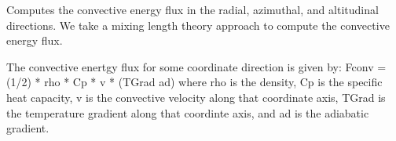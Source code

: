 \documentclass[letterpaper,10pt,english]{sphinxmanual}
\begin{document}
\begin{fulllineitems}
\begin{fulllineitems}
\label{\detokenize{CoolDwarf.star:CoolDwarf.star.sphere.VoxelSphere.convective_energy_flux}}
\pysigstartsignatures
{}
\pysigstopsignatures
\sphinxAtStartPar
Computes the convective energy flux in the radial, azimuthal, and altitudinal directions.
We take a mixing length theory approach to compute the convective energy flux.

\sphinxAtStartPar
The convective enertgy flux for some coordinate direction is given by:
Fconv = (1/2) * rho * Cp * v * (TGrad \sphinxhyphen{} ad)
where rho is the density, Cp is the specific heat capacity, v is the convective velocity along that coordinate axis,
TGrad is the temperature gradient along that coordinte axis, and ad is the adiabatic gradient.
\begin{quote}\begin{description}
\begin{description}
\end{description}

\end{description}\end{quote}

\end{fulllineitems}



\end{fulllineitems}
\end{document}
